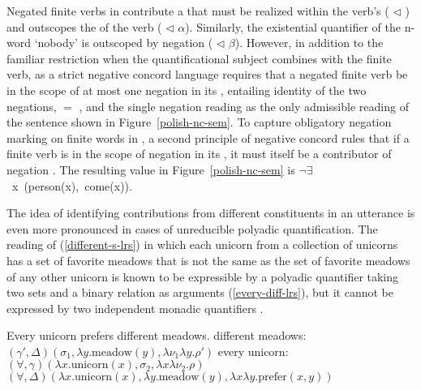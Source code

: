 \documentclass[output=paper
 	        ,biblatex
                ,babelshorthands
                ,newtxmath
                ,draftmode
                ,colorlinks, citecolor=brown
]{langscibook}
\begin{document}
Negated finite verbs in  contribute a  that must be realized
within the verb's  ( $\triangleleft$ ) and
outscopes the  of the verb ( $\triangleleft$ $\alpha$).
Similarly, the existential quantifier of the n-word  `nobody' is
outscoped by negation ( $\triangleleft$ $\beta$). However, in addition
to the familiar restriction when the quantificational subject combines
with the finite verb,  as a strict negative concord language requires
that a negated finite verb be in the scope of at most one negation in
its , entailing identity of the two negations,
 $=$ , and the single negation reading  as
the only admissible reading of the sentence shown in Figure~\ref{polish-nc-sem}.
To capture obligatory negation marking on finite words in , a second
principle of negative concord rules that if a finite verb is in the scope
of negation in its , it must itself be a contributor of negation \citep[316]{RichterandSailer2001}. The resulting  value
in Figure~\ref{polish-nc-sem} is \mbox{{\normalfont \sffamily $\neg \exists$ x (person(x), come(x))}}.

The idea of identifying contributions from different constituents in
an utterance is even more pronounced in cases of unreducible polyadic
quantification. The reading of (\ref{different-s-lrs}) in which each
unicorn from a collection of unicorns has a set of favorite meadows that
is not the same as the set of favorite meadows of any other unicorn is known
to be expressible by a polyadic quantifier taking two sets and a binary
relation as arguments (\ref{every-diff-lrs}), but it cannot be expressed by
two independent monadic quantifiers \citep{Keenan1992b}.


\begin{exe}
\ex\label{different-lrs}
\begin{xlist}
\ex\label{different-s-lrs} Every unicorn prefers different meadows.
\ex \label{different-meadows-lrs}
different meadows: \hspace{0.18cm} $(\gamma', \Delta)(\sigma_1, \lambda y.\text{meadow}(y), \lambda \nu_1\lambda y.\rho')$
\ex \label{every-unicorn-lrs}
every unicorn: \hspace{0.95cm}$(\forall, \gamma)(\lambda x.\text{unicorn}(x), \sigma_2, \lambda x\lambda \nu_2.\rho)$
\ex \label{every-diff-lrs}
$(\forall, \Delta)(\lambda x.\text{unicorn}(x), \lambda y.\text{meadow}(y), \lambda x\lambda y.\text{prefer}(x,y))$
\end{xlist}
\end{exe}
\end{document}
